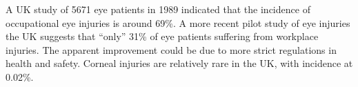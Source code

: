 A UK study of 5671 eye patients in 1989 indicated that the incidence of
occupational eye injuries is around 69\%.\cite{macewen1989eye} A more
recent pilot study of eye injuries the UK suggests that \enquote{only} 31\%
of eye patients suffering from workplace injuries.\cite{thompson2009occupational}
The apparent improvement could be due to more strict regulations in health
and safety. Corneal injuries are relatively rare in the UK, with incidence at
0.02\%.\cite{macdonald2009surveillance}


